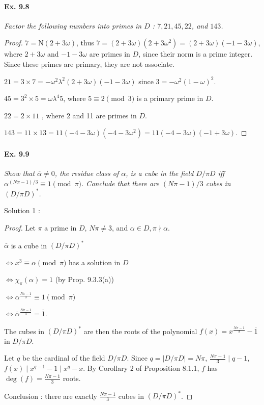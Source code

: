 \documentclass[11pt,a4paper]{article}
\newcommand{\n}{\mathrm{N}}
\begin{document}
\paragraph{Ex. 9.8}

{\it Factor the following numbers into primes in $D$ : $7,21,45,22$, and $143$.
}

\begin{proof}
$7=\n(2+3\omega)$, thus $ 7 = (2+3\omega)(2+3\omega^2) = (2+3\omega)(-1-3\omega)$, where $2 + 3\omega$ and $-1-3\omega$ are primes in $D$, since their norm is a prime integer. Since these primes are primary, they are not associate.

$21 = 3\times 7 = -\omega^2 \lambda^2 (2+3\omega)(-1-3\omega)$  since $3=-\omega^2(1-\omega)^2$.

$45 = 3^2\times 5 = \omega \lambda^4 5$, where $5 \equiv 2 \pmod 3$ is a primary prime in $D$.

$22=2\times 11$ , where 2 and 11 are primes in $D$.

$143 = 11\times 13 = 11(-4-3\omega)(-4-3\omega^2) = 11  (-4-3\omega)(-1+3\omega)$.
\end{proof}

\paragraph{Ex. 9.9}
{\it Show that $\overline{\alpha} \ne 0$, the residue class of $\alpha$, is a cube in the field $D/\pi D$ iff $\alpha^{(N\pi -1)/3} \equiv 1 \pmod \pi$. Conclude that there are $(N\pi - 1)/3$ cubes in $(D/\pi D)^*$.
}

\bigskip
Solution 1 : 
\begin{proof}
Let $\pi$ a prime in $D$, $N\pi \ne 3$, and $\alpha \in D,\pi \nmid \alpha$.

$\overline{\alpha}$ is a cube in $(D/\pi D)^*$

$\iff x^3 \equiv \alpha \pmod \pi$ has a solution in $D$

$\iff \chi_{\pi}(\alpha)= 1$ \qquad \qquad (by Prop. 9.3.3(a))

$\iff \alpha^{\frac{N\pi-1}{3}} \equiv 1 \pmod \pi$

$\iff \overline{\alpha}^{\frac{N\pi-1}{3}}  = \overline{1}$.

The cubes in $(D/\pi D)^*$ are then the roots of the polynomial $f(x) = x^{\frac{N\pi-1}{3}} - \overline{1}$ in $D/\pi D$. 

Let $q$ be the cardinal of the field $D/\pi D$. Since $q = |D/\pi D| = N\pi$, $\frac{N\pi - 1}{3} \mid q-1$, $f(x) \mid x^{q-1}-1 \mid x^q-x$. By Corollary 2 of Proposition 8.1.1, $f$ has $\deg(f) = \frac{N\pi-1}{3}$ roots.

Conclusion  : there are exactly $\frac{N\pi-1}{3}$ cubes in $(D/\pi D)^*$.
\end{proof}
\end{document}
